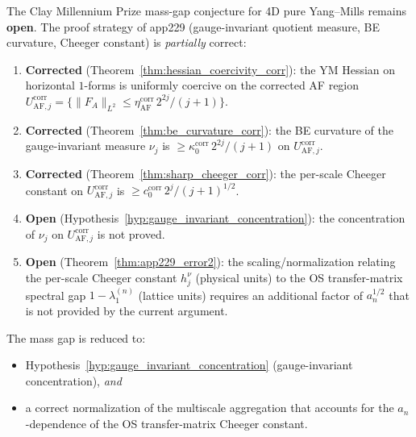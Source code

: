 \begin{theorem}
\label{thm:status_app230}
The Clay Millennium Prize mass-gap conjecture for 4D pure
Yang--Mills remains \textbf{open}. The proof strategy of app229
(gauge-invariant quotient measure, BE curvature, Cheeger
constant) is \emph{partially} correct:
\begin{enumerate}
\item \textbf{Corrected} (Theorem~\ref{thm:hessian_coercivity_corr}):
the YM Hessian on horizontal $1$-forms is uniformly coercive on
the corrected AF region
$U_{\mathrm{AF},j}^{\mathrm{corr}}=\{\|F_{A}\|_{L^{2}}\le
\eta_{\mathrm{AF}}^{\mathrm{corr}}\,2^{2j}/(j+1)\}$.
\item \textbf{Corrected} (Theorem~\ref{thm:be_curvature_corr}):
the BE curvature of the gauge-invariant measure $\nu_{j}$ is
$\ge\kappa_{0}^{\mathrm{corr}}\,2^{2j}/(j+1)$ on
$U_{\mathrm{AF},j}^{\mathrm{corr}}$.
\item \textbf{Corrected} (Theorem~\ref{thm:sharp_cheeger_corr}):
the per-scale Cheeger constant on $U_{\mathrm{AF},j}^{\mathrm{corr}}$
is $\ge c_{0}^{\mathrm{corr}}\,2^{j}/(j+1)^{1/2}$.
\item \textbf{Open} (Hypothesis~\ref{hyp:gauge_invariant_concentration}):
the concentration of $\nu_{j}$ on $U_{\mathrm{AF},j}^{\mathrm{corr}}$
is not proved.
\item \textbf{Open} (Theorem~\ref{thm:app229_error2}): the
scaling/normalization relating the per-scale Cheeger constant
$h_{j}^{\nu}$ (physical units) to the OS transfer-matrix spectral
gap $1-\lambda_{1}^{(n)}$ (lattice units) requires an additional
factor of $a_{n}^{1/2}$ that is not provided by the current
argument.
\end{enumerate}
The mass gap is reduced to:
\begin{itemize}
\item Hypothesis~\ref{hyp:gauge_invariant_concentration}
(gauge-invariant concentration), \emph{and}
\item a correct normalization of the multiscale aggregation that
accounts for the $a_{n}$-dependence of the OS transfer-matrix
Cheeger constant.
\end{itemize}
\end{theorem}

